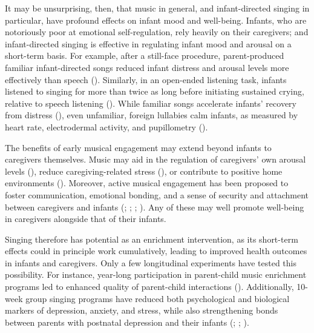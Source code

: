 \documentclass[
]{article}
\begin{document}
It may be unsurprising, then, that music in general, and infant-directed
singing in particular, have profound effects on infant mood and
well-being. Infants, who are notoriously poor at emotional
self-regulation, rely heavily on their caregivers; and infant-directed
singing is effective in regulating infant mood and arousal on a
short-term basis. For example, after a still-face procedure,
parent-produced familiar infant-directed songs reduced infant distress
and arousal levels more effectively than speech
(). Similarly, in an
open-ended listening task, infants listened to singing for more than
twice as long before initiating sustained crying, relative to speech
listening (). While
familiar songs accelerate infants' recovery from distress
(), even unfamiliar,
foreign lullabies calm infants, as measured by heart rate, electrodermal
activity, and pupillometry ().

The benefits of early musical engagement may extend beyond infants to
caregivers themselves. Music may aid in the regulation of caregivers'
own arousal levels (),
reduce caregiving-related stress (), or contribute to positive home environments
(). Moreover, active
musical engagement has been proposed to foster communication, emotional
bonding, and a sense of security and attachment between caregivers and
infants (;
;
;
). Any of these may
well promote well-being in caregivers alongside that of their infants.

Singing therefore has potential as an enrichment intervention, as its
short-term effects could in principle work cumulatively, leading to
improved health outcomes in infants and caregivers. Only a few
longitudinal experiments have tested this possibility. For instance,
year-long participation in parent-child music enrichment programs led to
enhanced quality of parent-child interactions
(). Additionally, 10-week
group singing programs have reduced both psychological and biological
markers of depression, anxiety, and stress, while also strengthening
bonds between parents with postnatal depression and their infants
(;
;
).
\end{document}
